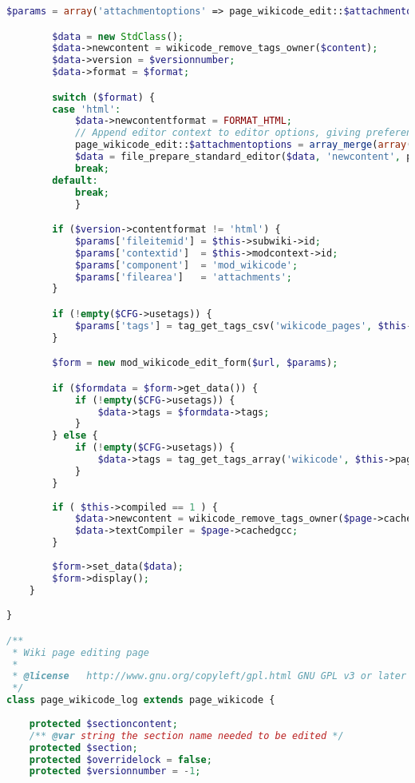 \begin{lstlisting}[language=PHP]
        $params = array('attachmentoptions' => page_wikicode_edit::$attachmentoptions, 'format' => $version->contentformat, 'version' => $versionnumber, 'pagetitle'=>$this->page->title);

        $data = new StdClass();
        $data->newcontent = wikicode_remove_tags_owner($content);
        $data->version = $versionnumber;
        $data->format = $format;

        switch ($format) {
        case 'html':
            $data->newcontentformat = FORMAT_HTML;
            // Append editor context to editor options, giving preference to existing context.
            page_wikicode_edit::$attachmentoptions = array_merge(array('context' => $this->modcontext), page_wikicode_edit::$attachmentoptions);
            $data = file_prepare_standard_editor($data, 'newcontent', page_wikicode_edit::$attachmentoptions, $this->modcontext, 'mod_wikicode', 'attachments', $this->subwiki->id);
            break;
        default:
            break;
            }

        if ($version->contentformat != 'html') {
            $params['fileitemid'] = $this->subwiki->id;
            $params['contextid']  = $this->modcontext->id;
            $params['component']  = 'mod_wikicode';
            $params['filearea']   = 'attachments';
        }

        if (!empty($CFG->usetags)) {
            $params['tags'] = tag_get_tags_csv('wikicode_pages', $this->page->id, TAG_RETURN_TEXT);
        }

        $form = new mod_wikicode_edit_form($url, $params);

        if ($formdata = $form->get_data()) {
            if (!empty($CFG->usetags)) {
                $data->tags = $formdata->tags;
            }
        } else {
            if (!empty($CFG->usetags)) {
                $data->tags = tag_get_tags_array('wikicode', $this->page->id);
            }
        }
		
		if ( $this->compiled == 1 ) {
			$data->newcontent = wikicode_remove_tags_owner($page->cachedcompile);
			$data->textCompiler = $page->cachedgcc;
		}
		
        $form->set_data($data);
        $form->display();
    }

}

/**
 * Wiki page editing page
 *
 * @license   http://www.gnu.org/copyleft/gpl.html GNU GPL v3 or later
 */
class page_wikicode_log extends page_wikicode {
	
	protected $sectioncontent;
    /** @var string the section name needed to be edited */
    protected $section;
    protected $overridelock = false;
    protected $versionnumber = -1;


\end{lstlisting}
